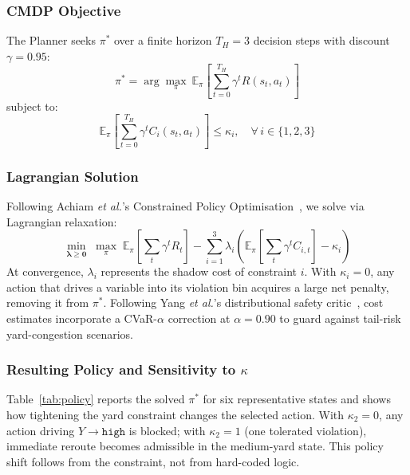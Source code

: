 \documentclass[conference]{IEEEtran}
\begin{document}
\subsubsection{CMDP Objective}
The Planner seeks $\pi^*$ over a finite horizon $T_H = 3$ decision steps with discount $\gamma = 0.95$:
\begin{equation}
  \pi^* = \arg\max_{\pi}\ \mathbb{E}_{\pi}\!\left[\sum_{t=0}^{T_H} \gamma^t R(s_t, a_t)\right]
  \label{eq:cmdp_obj}
\end{equation}
subject to:
\begin{equation}
  \mathbb{E}_{\pi}\!\left[\sum_{t=0}^{T_H} \gamma^t C_i(s_t, a_t)\right] \leq \kappa_i,
  \quad \forall\, i \in \{1,2,3\}
  \label{eq:cmdp_con}
\end{equation}


\subsubsection{Lagrangian Solution}
Following Achiam \emph{et al.}'s Constrained Policy Optimisation~\cite{achiam2017}, we solve via Lagrangian relaxation:
\begin{equation}
  \min_{\boldsymbol{\lambda} \geq \mathbf{0}}\; \max_{\pi}\;
  \mathbb{E}_\pi\!\left[\sum_t \gamma^t R_t\right]
  - \sum_{i=1}^{3} \lambda_i\!\left(\mathbb{E}_\pi\!\left[\sum_t \gamma^t C_{i,t}\right] - \kappa_i\right)
  \label{eq:lagrange}
\end{equation}
At convergence, $\lambda_i$ represents the shadow cost of constraint $i$. With $\kappa_i = 0$, any action that drives a variable into its violation bin acquires a large net penalty, removing it from $\pi^*$. Following Yang \emph{et al.}'s distributional safety critic~\cite{yang2023}, cost estimates incorporate a CVaR-$\alpha$ correction at $\alpha = 0.90$ to guard against tail-risk yard-congestion scenarios.

\subsubsection{Resulting Policy and Sensitivity to \texorpdfstring{$\kappa$}{kappa}}
Table~\ref{tab:policy} reports the solved $\pi^*$ for six representative states and shows how tightening the yard constraint changes the selected action. With $\kappa_2 = 0$, any action driving $Y \to \texttt{high}$ is blocked; with $\kappa_2 = 1$ (one tolerated violation), immediate reroute becomes admissible in the medium-yard state. This policy shift follows from the constraint, not from hard-coded logic.
\end{document}
